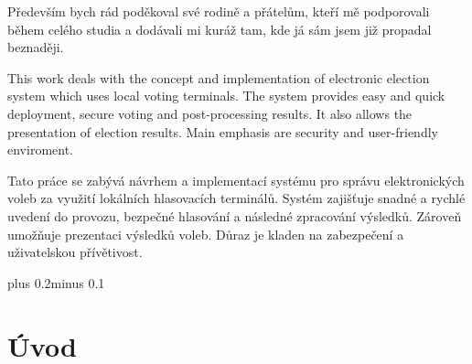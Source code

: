 \documentclass[11pt,twoside,a4paper]{book}
\begin{document}

\coverpagestarts


\acknowledgements
\noindent
Především bych rád poděkoval své rodině a přátelům, kteří mě podporovali během celého studia a dodávali mi kuráž tam, kde já sám jsem již propadal beznaději.





 
\abstractpage

This work deals with the concept and implementation of electronic election system which uses local voting terminals. The system provides easy and quick deployment, secure voting and post-processing results. It also allows the presentation of election results. Main emphasis are security and user-friendly enviroment.


\baselineskip

Tato práce se zabývá návrhem a implementací systému pro správu elektronických voleb za využití lokálních hlasovacích terminálů. Systém zajišťuje snadné a rychlé uvedení do provozu, bezpečné hlasování a následné zpracování výsledků. Zároveň umožňuje prezentaci výsledků voleb. Důraz je kladen na zabezpečení a uživatelskou přívětivost.


\tableofcontents



\listoffigures



\listoftables



\mainbodystarts
\normalfont
{}\baselineskip plus 0.2\baselineskip minus 0.1\baselineskip

 



\chapter{Úvod}
\end{document}
